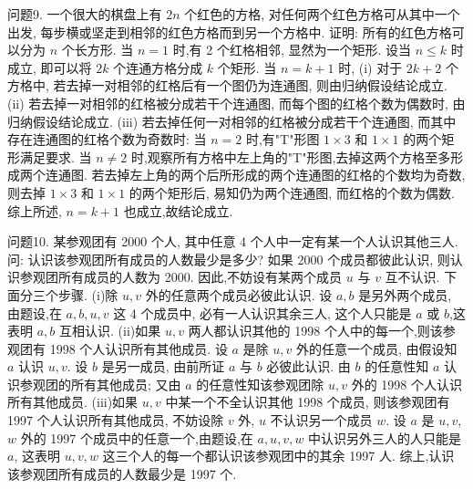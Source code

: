问题9. 一个很大的棋盘上有 $2 n$ 个红色的方格, 对任何两个红色方格可从其中一个出发, 每步横或坚走到相邻的红色方格而到另一个方格中.
证明: 所有的红色方格可以分为 $n$ 个长方形.
当 $n=1$ 时,有 2 个红格相邻, 显然为一个矩形.
设当 $n \leqslant k$ 时成立, 即可以将 $2 k$ 个连通方格分成 $k$ 个矩形.
当 $n=k+1$ 时,
(i) 对于 $2 k+2$ 个方格中, 若去掉一对相邻的红格后有一个图仍为连通图, 则由归纳假设结论成立.
(ii) 若去掉一对相邻的红格被分成若干个连通图, 而每个图的红格个数为偶数时, 由归纳假设结论成立.
(iii) 若去掉任何一对相邻的红格被分成若干个连通图, 而其中存在连通图的红格个数为奇数时:
当 $n=2$ 时,有"T"形图 $1 \times 3$ 和 $1 \times 1$ 的两个矩形满足要求.
当 $n \neq 2$ 时,观察所有方格中左上角的"T"形图,去掉这两个方格至多形成两个连通图.
若去掉左上角的两个后所形成的两个连通图的红格的个数均为奇数,则去掉 $1 \times 3$ 和 $1 \times 1$ 的两个矩形后, 易知仍为两个连通图, 而红格的个数为偶数.
综上所述, $n=k+1$ 也成立,故结论成立.



问题10. 某参观团有 2000 个人, 其中任意 4 个人中一定有某一个人认识其他三人.
问: 认识该参观团所有成员的人数最少是多少?
如果 2000 个成员都彼此认识, 则认识参观团所有成员的人数为 2000. 因此,不妨设有某两个成员 $u$ 与 $v$ 互不认识.
下面分三个步骤.
(i)除 $u, v$ 外的任意两个成员必彼此认识.
设 $a, b$ 是另外两个成员, 由题设,在 $a, b, u, v$ 这 4 个成员中, 必有一人认识其余三人, 这个人只能是 $a$ 或 $b$,这表明 $a, b$ 互相认识.
(ii)如果 $u, v$ 两人都认识其他的 1998 个人中的每一个,则该参观团有 1998 个人认识所有其他成员.
设 $a$ 是除 $u, v$ 外的任意一个成员, 由假设知 $a$ 认识 $u, v$. 设 $b$ 是另一成员, 由前所证 $a$ 与 $b$ 必彼此认识.
由 $b$ 的任意性知 $a$ 认识参观团的所有其他成员; 又由 $a$ 的任意性知该参观团除 $u, v$ 外的 1998 个人认识所有其他成员.
(iii)如果 $u, v$ 中某一个不全认识其他 1998 个成员, 则该参观团有 1997 个人认识所有其他成员, 不妨设除 $v$ 外, $u$ 不认识另一个成员 $w$. 设 $a$ 是 $u, v$, $w$ 外的 1997 个成员中的任意一个,由题设,在 $a, u, v, w$ 中认识另外三人的人只能是 $a$, 这表明 $u, v, w$ 这三个人的每一个都认识该参观团中的其余 1997 人.
综上,认识该参观团所有成员的人数最少是 1997 个.



